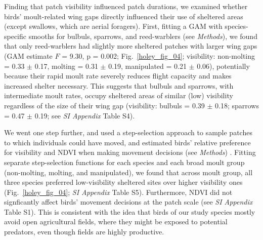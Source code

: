 Finding that patch visibility influenced patch durations, we examined whether birds' moult-related wing gaps directly influenced their use of sheltered areas (except swallows, which are aerial foragers).
First, fitting a GAM with species-specific smooths for bulbuls, sparrows, and reed-warblers (see \textit{Methods}), we found that only reed-warblers had slightly more sheltered patches with larger wing gaps (GAM estimate $F$ = 9.30, p = 0.002; Fig.~\ref{holey_fig_04}; visibility: non-molting = 0.33 $\pm$ 0.17, molting = 0.31 $\pm$ 0.19, manipulated = 0.21 $\pm$ 0.06), potentially because their rapid moult rate severely reduces flight capacity and makes increased shelter necessary.
This suggests that bulbuls and sparrows, with intermediate moult rates, occupy sheltered areas of similar (low) visibility regardless of the size of their wing gap (visibility: bulbuls =  0.39 $\pm$ 0.18; sparrows = 0.47 $\pm$ 0.19; see \textit{SI Appendix} Table S4).

We went one step further, and used a step-selection approach to sample patches to which individuals could have moved, and estimated birds' relative preference for visibility and NDVI when making movement decisions (see \textit{Methods}) \citep{avgar2016,aben2021}.
Fitting separate step-selection functions for each species and each broad moult group (non-molting, molting, and manipulated), we found that across moult group, all three species preferred low-visibility sheltered sites over higher visibility ones (Fig.~\ref{holey_fig_04}; \textit{SI Appendix} Table S5).
Furthermore, NDVI did not signficantly affect birds' movement decisions at the patch scale (see \textit{SI Appendix} Table {S1}).
This is consistent with the idea that birds of our study species mostly avoid open agricultural fields, where they might be exposed to potential predators, even though fields are highly productive.

